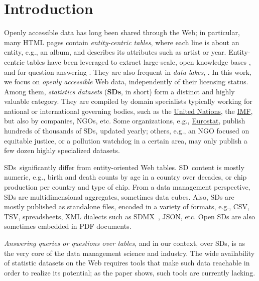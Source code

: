 \section{Introduction}\label{section:introduction}

Openly accessible data has long been shared through the Web; in
particular, many HTML pages contain \emph{entity-centric tables}, where
each line is about an entity, e.g., an album, and describes its attributes such as artist or year. Entity-centric tables have been leveraged to extract large-scale, open knowledge bases \cite{DBLP:conf/wsdm/LockardSDH20,DBLP:conf/semweb/AuerBKLCI07,DBLP:conf/esws/TanonWS20,DBLP:journals/ftdb/WeikumDRS21}, and for question answering \cite{DBLP:journals/pacmmod/WangF23,herzig-etal-2021-open,Christmann2023CompMixAB,Hulsebos2024ItTL}.
They are also frequent in \emph{data lakes}, \cite{fan_semantics-aware_2023,deng_lakebench_2024,christensen_fantastic_2025}.
In this work, we focus on \emph{openly accessible} Web data, independently of their licensing status. Among them, \emph{statistics datasets} (\textbf{SDs}, in short) form a distinct and highly valuable category.
They are compiled by domain specialists typically working for national
or international governing bodies, such as the
\href{https://www.un.org/}{United Nations}, the
\href{https://www.imf.org/}{IMF}, but also by companies, NGOs, etc.
Some organizations, e.g.,
\href{https://ec.europa.eu/eurostat/}{Eurostat}, publish hundreds of
thousands of SDs, updated yearly; others, e.g., an NGO focused on equitable justice, or a pollution watchdog in a certain area, may only publish a few dozen highly specialized datasets.

SDs~significantly differ from entity-oriented Web tables.
SD~content is
mostly numeric, e.g.,  birth and death counts by age in a
country over decades, or chip production per country and type of chip.
From a data management perspective, SDs are multidimensional
	aggregates, sometimes data cubes.
Also, SDs are mostly  published as standalone files, encoded in a
variety of formats, e.g., CSV, TSV, spreadsheets, XML dialects such as
SDMX~\cite{sdmx}, JSON, etc. Open SDs are also sometimes embedded in PDF
documents.

\emph{Answering queries or questions over tables}, and
  in our context, over SDs, is as the very core of the data management
  science and industry. The wide availability of statistic datasets on the Web requires tools that make
such data reachable in order to realize its potential; as the paper shows, such tools are currently lacking.

